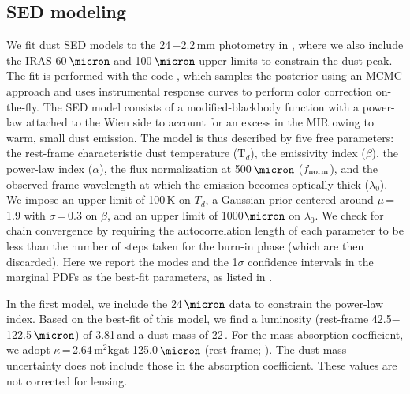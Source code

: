 \documentclass[]{emulateapj}
\begin{document}
\subsection{SED modeling} \label{sec:SED}  %
We fit dust SED models to the
24\,\micron$-$2.2\,mm photometry in , where we also
include the IRAS 60\,$\micron$ and 100\,$\micron$ upper limits
to constrain the dust peak.
The fit is performed with the code
 \citep[\eg][]{Dowell14a}, which samples the posterior
using an MCMC approach and uses instrumental
response curves to perform color correction on-the-fly.
The SED model consists of a modified-blackbody
function with a power-law attached to the
Wien side to account for an excess in the MIR owing to warm,
small dust emission.
%
The model is thus described by five free parameters: the rest-frame characteristic dust
temperature (T$_{d}$), the emissivity index ($\beta$), the power-law index
($\alpha$), the flux normalization at 500\,$\micron$ ($f_{\rm norm}$), and
the observed-frame wavelength at which the emission
becomes optically thick ($\lambda_{0}$). We impose
an upper limit of 100\,K on $T_d$, a Gaussian prior centered around
$\mu$\,=\,1.9 with $\sigma$\,=\,0.3 on $\beta$, and an upper limit of
1000$\micron$ on $\lambda_0$.
We check for chain convergence by requiring the autocorrelation
length of each parameter to be less than the number of steps
taken for the burn-in phase (which are then discarded).
Here we report the modes %
and the 1$\sigma$ confidence intervals in the marginal PDFs
as the best-fit parameters, as listed in .



In the first model, we include the 24\,$\micron$ data
to constrain the power-law index. Based on the
best-fit of this model, we find a
\fir luminosity (rest-frame 42.5$-$122.5\,$\micron$) of
3.81\,\Lsun and a
dust mass of 22\,\Msun.
For the mass absorption coefficient, we adopt
$\kappa$\,=\,2.64\,m$^2$kg\pmOne at 125.0\,$\micron$
(rest frame; \citealt{Dunne03a}).
The dust mass uncertainty does not
include those in the absorption coefficient.
These values are not corrected for lensing.
\end{document}
